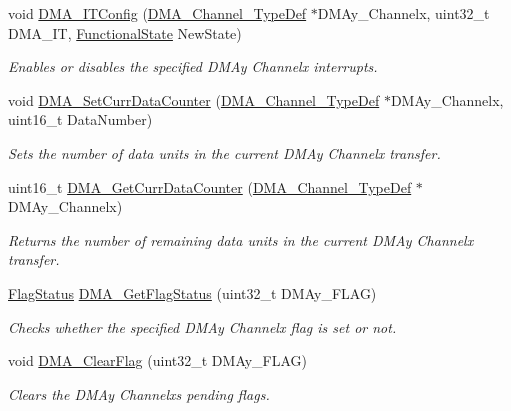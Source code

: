 \begin{DoxyCompactItemize}
void \hyperlink{group___d_m_a___private___functions_ga0bb60360be9cd57f96399be2f3b5eb2b}{D\+M\+A\+\_\+\+I\+T\+Config} (\hyperlink{struct_d_m_a___channel___type_def}{D\+M\+A\+\_\+\+Channel\+\_\+\+Type\+Def} $\ast$D\+M\+Ay\+\_\+\+Channelx, uint32\+\_\+t D\+M\+A\+\_\+\+IT, \hyperlink{group___exported__types_gac9a7e9a35d2513ec15c3b537aaa4fba1}{Functional\+State} New\+State)
\begin{DoxyCompactList}\small\item\em Enables or disables the specified D\+M\+Ay Channelx interrupts. \end{DoxyCompactList}\item 
void \hyperlink{group___d_m_a___private___functions_gade5d9e532814eaa46514cb385fdff709}{D\+M\+A\+\_\+\+Set\+Curr\+Data\+Counter} (\hyperlink{struct_d_m_a___channel___type_def}{D\+M\+A\+\_\+\+Channel\+\_\+\+Type\+Def} $\ast$D\+M\+Ay\+\_\+\+Channelx, uint16\+\_\+t Data\+Number)
\begin{DoxyCompactList}\small\item\em Sets the number of data units in the current D\+M\+Ay Channelx transfer. \end{DoxyCompactList}\item 
uint16\+\_\+t \hyperlink{group___d_m_a___private___functions_ga511b4c402d1ff32d53f28736956cac5d}{D\+M\+A\+\_\+\+Get\+Curr\+Data\+Counter} (\hyperlink{struct_d_m_a___channel___type_def}{D\+M\+A\+\_\+\+Channel\+\_\+\+Type\+Def} $\ast$D\+M\+Ay\+\_\+\+Channelx)
\begin{DoxyCompactList}\small\item\em Returns the number of remaining data units in the current D\+M\+Ay Channelx transfer. \end{DoxyCompactList}\item 
\hyperlink{group___exported__types_ga89136caac2e14c55151f527ac02daaff}{Flag\+Status} \hyperlink{group___d_m_a___private___functions_gafb30b7a891834c267eefd5d30b688a9f}{D\+M\+A\+\_\+\+Get\+Flag\+Status} (uint32\+\_\+t D\+M\+Ay\+\_\+\+F\+L\+AG)
\begin{DoxyCompactList}\small\item\em Checks whether the specified D\+M\+Ay Channelx flag is set or not. \end{DoxyCompactList}\item 
void \hyperlink{group___d_m_a___private___functions_ga25cdca360f309c8ceb7c206cd9ad9119}{D\+M\+A\+\_\+\+Clear\+Flag} (uint32\+\_\+t D\+M\+Ay\+\_\+\+F\+L\+AG)
\begin{DoxyCompactList}\small\item\em Clears the D\+M\+Ay Channelx\textquotesingle{}s pending flags. \end{DoxyCompactList}\item 

\end{DoxyCompactItemize}
